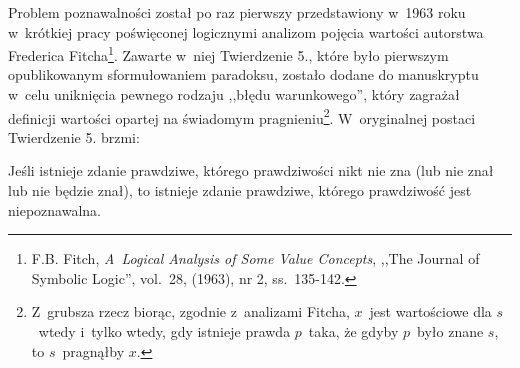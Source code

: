 Problem poznawalności został po raz pierwszy przedstawiony w~1963 roku w~krótkiej pracy poświęconej logicznymi analizom pojęcia wartości autorstwa Frederica Fitcha\footnote{F.B. Fitch, \textit{A~Logical Analysis of Some Value Concepts}, ,,The Journal of Symbolic Logic'', vol.~28, (1963), nr 2, ss.~135-142.}. Zawarte w~niej Twierdzenie 5., które było pierwszym opublikowanym sformułowaniem paradoksu, zostało dodane do manuskryptu w~celu uniknięcia pewnego rodzaju ,,błędu warunkowego'', który zagrażał definicji wartości opartej na świadomym pragnieniu\footnote{Z~grubsza rzecz biorąc, zgodnie z~analizami Fitcha, $x$~jest wartościowe dla $s$~wtedy i~tylko wtedy, gdy istnieje prawda $p$~taka, że gdyby $p$~było znane $s$, to $s$~pragnąłby $x$.}. W~oryginalnej postaci Twierdzenie 5. brzmi:
\begin{tw}\label{scep-par-cf-fitch}
Jeśli istnieje zdanie prawdziwe, którego prawdziwości nikt nie zna (lub nie znał lub nie będzie znał), to istnieje zdanie prawdziwe, którego prawdziwość jest niepoznawalna.
\end{tw}
